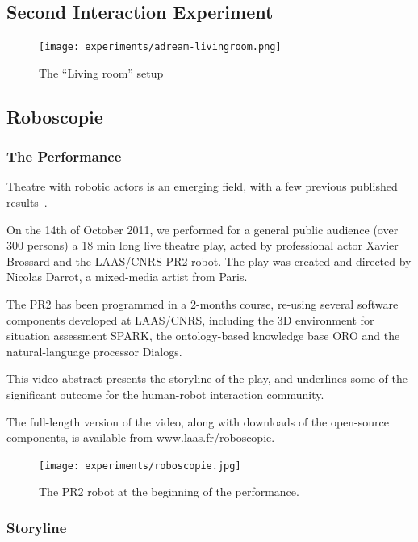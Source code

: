 \subsection{Second Interaction Experiment}
\label{sect|expe2}

\begin{figure}
    \centering
    \texttt{[image: experiments/adream-livingroom.png]}
    \caption{The ``Living room'' setup}
    \label{fig|livingroom}
\end{figure}


\subsection{Roboscopie}
\label{sect|roboscopie}

\subsubsection{The Performance}

Theatre with robotic actors is an emerging field, with a few previous published
results~\cite{Breazeal2003, Lin2009, Mavridis2009}.

On the 14th of October 2011, we performed for a general public audience (over
300 persons) a 18 min long live theatre play, acted by professional actor
Xavier Brossard and the LAAS/CNRS PR2 robot. The play was created and directed
by Nicolas Darrot, a mixed-media artist from Paris.

The PR2 has been programmed in a 2-months course, re-using several software
components developed at LAAS/CNRS, including the 3D environment for situation
assessment SPARK, the ontology-based knowledge base ORO and the natural-language
processor {\sc Dialogs}.

This video abstract presents the storyline of the play, and underlines some of
the significant outcome for the human-robot interaction community.

The full-length version of the video, along with downloads of the open-source
components, is available from \url{www.laas.fr/roboscopie}.

\begin{figure}
    \centering
    \texttt{[image: experiments/roboscopie.jpg]}
    \caption{The PR2 robot at the beginning of the performance.}
    \label{fig|pr2-opens-curtains}
\end{figure}


\subsubsection{Storyline}

